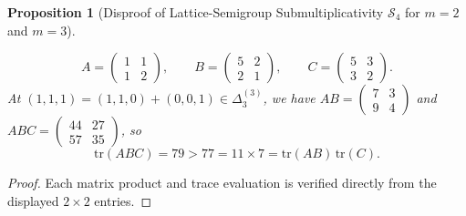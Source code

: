 \documentclass[11pt,a4paper]{article}
\newtheorem{proposition}[theorem]{Proposition}
\theoremstyle{definition}
\theoremstyle{remark}
\newcommand{\tr}{\mathrm{tr}}
\newcommand{\DeltaLat}{\Delta}
\begin{document}
\begin{proposition}[Disproof of Lattice-Semigroup Submultiplicativity $\mathcal{S}_4$ for $m = 2$ and $m = 3$]
\begin{enumerate}
\[
A = \begin{pmatrix} 1 & 1 \\ 1 & 2 \end{pmatrix}, \qquad
B = \begin{pmatrix} 5 & 2 \\ 2 & 1 \end{pmatrix}, \qquad
C = \begin{pmatrix} 5 & 3 \\ 3 & 2 \end{pmatrix}.
\]
At $(1, 1, 1) = (1, 1, 0) + (0, 0, 1) \in \DeltaLat_3^{(3)}$, we have $AB = \begin{pmatrix} 7 & 3 \\ 9 & 4 \end{pmatrix}$ and $ABC = \begin{pmatrix} 44 & 27 \\ 57 & 35 \end{pmatrix}$, so
\[
\tr(ABC) = 79 > 77 = 11 \times 7 = \tr(AB)\,\tr(C).
\]
\end{enumerate}
\end{proposition}
\begin{proof}
Each matrix product and trace evaluation is verified directly from the displayed $2 \times 2$ entries.
\end{proof}
\end{document}
